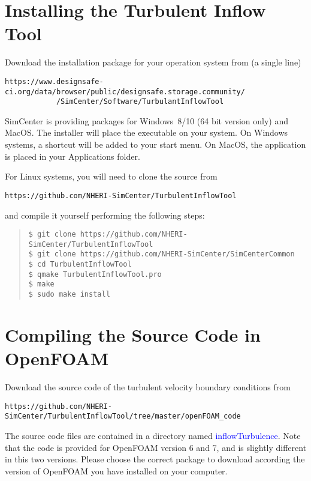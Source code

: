 \label{sec:TInF-installation}

\section{Installing the Turbulent Inflow Tool}

Download the installation package for your operation system from (a single line)
\begin{verbatim}
https://www.designsafe-ci.org/data/browser/public/designsafe.storage.community/
            /SimCenter/Software/TurbulantInflowTool
\end{verbatim}
 SimCenter is providing packages for Windows~8/10 (64 bit version only) and MacOS.  
The installer will place the executable on your system.  On Windows systems, a shortcut will be added to your start menu.
On MacOS, the application is placed in your Applications folder.
\bigskip

For Linux systems, you will need to clone the source from 
\begin{verbatim}
https://github.com/NHERI-SimCenter/TurbulentInflowTool
\end{verbatim}
and compile it yourself performing the following steps:
\begin{quote}
\begin{verbatim}
$ git clone https://github.com/NHERI-SimCenter/TurbulentInflowTool
$ git clone https://github.com/NHERI-SimCenter/SimCenterCommon
$ cd TurbulentInflowTool
$ qmake TurbulentInflowTool.pro
$ make
$ sudo make install
\end{verbatim}
\end{quote}

\section{Compiling the Source Code in OpenFOAM}

Download the source code of the turbulent velocity boundary conditions from
\begin{verbatim}
https://github.com/NHERI-SimCenter/TurbulentInflowTool/tree/master/openFOAM_code
\end{verbatim}

\noindent  The source code files are contained in a directory named \textcolor{blue}{inflowTurbulence}. Note that the code is provided for OpenFOAM version 6 and 7, and is slightly different in this two versions. Please choose the correct package to download according the version of OpenFOAM you have installed on your computer.

